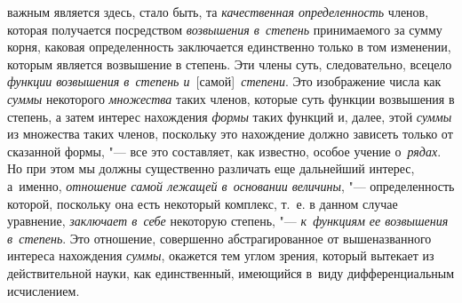 важным является здесь, стало быть, та {\em качественная определенность} членов,
которая получается посредством {\em возвышения в~степень} принимаемого за сумму
корня, каковая определенность заключается единственно только в том изменении,
которым является возвышение в степень. Эти члены суть, следовательно, всецело
{\em функции возвышения в~степень и}~[самой]~{\em степени}. Это изображение
числа как {\em суммы} некоторого {\em множества} таких членов, которые суть
функции возвышения в степень, а затем интерес нахождения {\em формы} таких
функций и, далее, этой {\em суммы} из множества таких членов, поскольку это
нахождение должно зависеть только от сказанной формы, "--- все это составляет,
как известно, особое учение о~{\em рядах}. Но при этом мы должны существенно
различать еще дальнейший интерес, а~именно, {\em отношение самой лежащей
в~основании величины}, "--- определенность которой, поскольку она есть
некоторый комплекс, т.~е. в данном случае уравнение, {\em заключает в~себе}
некоторую степень, "--- {\em к~функциям ее возвышения в~степень}. Это
отношение, совершенно абстрагированное от вышеназванного интереса нахождения
{\em суммы}, окажется тем углом зрения, который вытекает из действительной
науки, как единственный, имеющийся в~виду дифференциальным исчислением.


